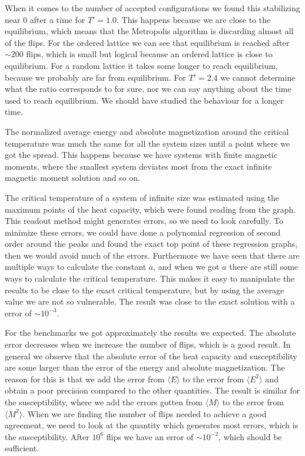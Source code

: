 \documentclass[norsk,a4paper,12pt]{article}
\begin{document}
When it comes to the number of accepted configurations we found this stabilizing near 0 after a time for $T'=1.0$. This happens because we are close to the equilibrium, which means that the Metropolis algorithm is discarding almost all of the flips. For the ordered lattice we can see that equilibrium is reached after $\sim200$ flips, which is small but logical because an ordered lattice is close to equilibrium. For a random lattice it takes some longer to reach equilibrium, because we probably are far from equilibrium. For $T'=2.4$ we cannot determine what the ratio corresponds to for sure, nor we can say anything about the time used to reach equilibrium. We should have studied the behaviour for a longer time. \par\vspace{5mm}

The normalized average energy and absolute magnetization around the critical temperature was much the same for all the system sizes until a point where we got the spread. This happens because we have systems with finite magnetic moments, where the smallest system deviates most from the exact infinite magnetic moment solution and so on.\par\vspace{5mm}

The critical temperature of a system of infinite size was estimated using the maximum points of the heat capacity, which were found reading from the graph. This readout method might generates errors, so we need to look carefully. To minimize these errors, we could have done a polynomial regression of second order around the peaks and found the exact top point of these regression graphs, then we would avoid much of the errors. Furthermore we have seen that there are multiple ways to calculate the constant $a$, and when we got $a$ there are still some ways to calculate the critical temperature. This makes it easy to manipulate the results to be close to the exact critical temperature, but by using the average value we are not so vulnerable. The result was close to the exact solution with a error of $\sim 10^{-3}$.\par\vspace{5mm}

For the benchmarks we got approximately the results we expected. The absolute error decreases when we increase the number of flips, which is a good result. In general we observe that the absolute error of the heat capacity and susceptibility are some larger than the error of the energy and absolute magnetization. The reason for this is that we add the error from $\langle E\rangle$ to the error from $\langle E^2\rangle$ and obtain a poor precision compared to the other quantities. The result is similar for the susceptibility, where we add the errors gotten from $\langle M\rangle$ to the error from $\langle M^2\rangle$. When we are finding the number of flips needed to achieve a good agreement, we need to look at the quantity which generates most errors, which is the susceptibility. After $10^6$ flips we have an error of $\sim10^{-2}$, which should be sufficient.\par\vspace{5mm}
\end{document}
